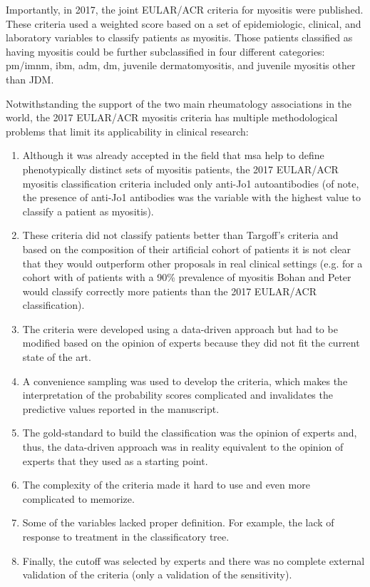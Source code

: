 Importantly, in 2017, the joint EULAR/ACR criteria for myositis were published.\cite{Lundberg2017} These criteria used a weighted score based on a set of epidemiologic, clinical, and laboratory variables to classify patients as myositis. Those patients classified as having myositis could be further subclassified in four different categories: \gls{pm}/\gls{imnm}, \gls{ibm}, \gls{adm}, \gls{dm}, juvenile dermatomyositis, and juvenile myositis other than JDM.\cite{Lundberg2017}

Notwithstanding the support of the two main rheumatology associations in the world, the 2017 EULAR/ACR myositis criteria has multiple methodological problems that limit its applicability in clinical research:

\begin{enumerate}
	\item Although it was already accepted in the field that \gls{msa} help to define phenotypically distinct sets of myositis patients, the 2017 EULAR/ACR myositis classification criteria included only anti-Jo1 autoantibodies (of note, the presence of anti-Jo1 antibodies was the variable with the highest value to classify a patient as myositis).
	
	\item These criteria did not classify patients better than Targoff's criteria and based on the composition of their artificial cohort of patients it is not clear that they would outperform other proposals in real clinical settings (e.g. for a cohort with of patients with a 90\% prevalence of myositis Bohan and Peter would classify correctly more patients than the 2017 EULAR/ACR classification).
	
	\item The criteria were developed using a data-driven approach but had to be modified based on the opinion of experts because they did not fit the current state of the art.
	
	\item A convenience sampling was used to develop the criteria, which makes the interpretation of the probability scores complicated and invalidates the predictive values reported in the manuscript.
	
	\item The gold-standard to build the classification was the opinion of experts and, thus, the data-driven approach was in reality equivalent to the opinion of experts that they used as a starting point.
	
	\item The complexity of the criteria made it hard to use and even more complicated to memorize.
	
	\item Some of the variables lacked proper definition. For example, the lack of response to treatment in the classificatory tree.
	
	\item Finally, the cutoff was selected by experts and there was no complete external validation of the criteria (only a validation of the sensitivity).
\end{enumerate}

